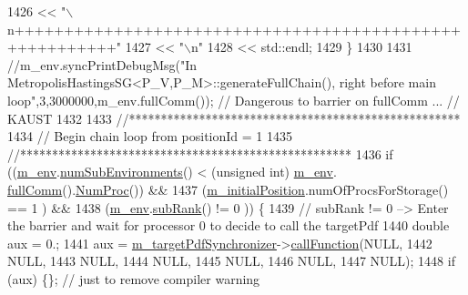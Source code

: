 \begin{DoxyCode}
1426                             << \textcolor{stringliteral}{"\(\backslash\)n++++++++++++++++++++++++++++++++++++++++++++++++++++++++"}
1427                             << \textcolor{stringliteral}{"\(\backslash\)n"}
1428                             << std::endl;
1429   \}
1430 
1431   \textcolor{comment}{//m\_env.syncPrintDebugMsg("In MetropolisHastingsSG<P\_V,P\_M>::generateFullChain(), right before main
       loop",3,3000000,m\_env.fullComm()); // Dangerous to barrier on fullComm ... // KAUST}
1432 
1433   \textcolor{comment}{//****************************************************}
1434   \textcolor{comment}{// Begin chain loop from positionId = 1}
1435   \textcolor{comment}{//****************************************************}
1436   \textcolor{keywordflow}{if} ((\hyperlink{class_q_u_e_s_o_1_1_metropolis_hastings_s_g_ac8ea061e55b920e0c8f9bce5c3f20e52}{m\_env}.\hyperlink{class_q_u_e_s_o_1_1_base_environment_ac0345f57e31ef7833e379ed972bd094d}{numSubEnvironments}() < (\textcolor{keywordtype}{unsigned} int) \hyperlink{class_q_u_e_s_o_1_1_metropolis_hastings_s_g_ac8ea061e55b920e0c8f9bce5c3f20e52}{m\_env}.
      \hyperlink{class_q_u_e_s_o_1_1_base_environment_a0b0779b41ff304058856e97e1d16b4d4}{fullComm}().\hyperlink{class_q_u_e_s_o_1_1_mpi_comm_aa780721ae0fdeabc5a15e04cb0cad964}{NumProc}()) &&
1437       (\hyperlink{class_q_u_e_s_o_1_1_metropolis_hastings_s_g_ae29f5d1198228858283d733021da2b14}{m\_initialPosition}.numOfProcsForStorage() == 1                         ) &&
1438       (\hyperlink{class_q_u_e_s_o_1_1_metropolis_hastings_s_g_ac8ea061e55b920e0c8f9bce5c3f20e52}{m\_env}.\hyperlink{class_q_u_e_s_o_1_1_base_environment_a172d52f993f1322ed45aaddf71518dbb}{subRank}()                          != 0                         )) \{
1439     \textcolor{comment}{// subRank != 0 --> Enter the barrier and wait for processor 0 to decide to call the targetPdf}
1440     \textcolor{keywordtype}{double} aux = 0.;
1441     aux = \hyperlink{class_q_u_e_s_o_1_1_metropolis_hastings_s_g_ae7c7551764e0ccdfbe2862c544cdab10}{m\_targetPdfSynchronizer}->\hyperlink{class_q_u_e_s_o_1_1_scalar_function_synchronizer_adcdc70486ac64c11d0e505c4fb590a6b}{callFunction}(NULL,
1442                                                 NULL,
1443                                                 NULL,
1444                                                 NULL,
1445                                                 NULL,
1446                                                 NULL,
1447                                                 NULL);
1448     \textcolor{keywordflow}{if} (aux) \{\}; \textcolor{comment}{// just to remove compiler warning}

\end{DoxyCode}
